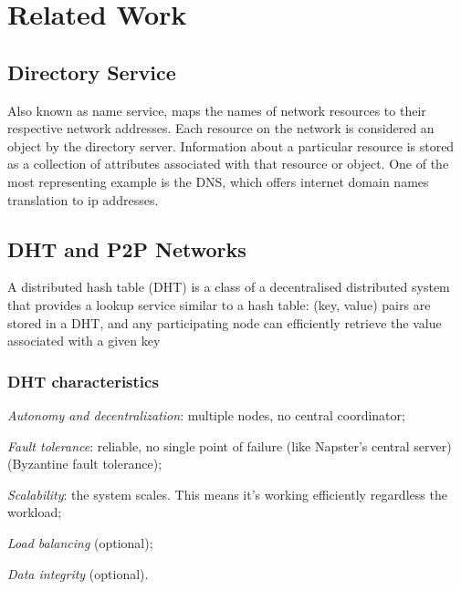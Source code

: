 \chapter{Related Work}
\label{chapter:related_work}

\section{Directory Service}
Also known as name service, maps the names of network resources to their respective network addresses. Each resource on the network is considered an object by the directory server. Information about a particular resource is stored as a collection of attributes associated with that resource or object. One of the most representing example is the DNS, which offers internet domain names translation to ip addresses.

\section{DHT and P2P Networks}
A distributed hash table (DHT) is a class of a decentralised distributed system that provides a lookup service similar to a hash table: (key, value) pairs are stored in a DHT, and any participating node can efficiently retrieve the value associated with a given key

\subsection{DHT characteristics}
\begin{list}{}{}
\item \emph{Autonomy and decentralization}: multiple nodes, no central coordinator;
\item \emph{Fault tolerance}: reliable, no single point of failure (like Napster’s central server) (Byzantine fault tolerance);
\item \emph{Scalability}: the system scales. This means it’s working efficiently regardless the workload; 
\item \emph{Load balancing} (optional);
\item \emph{Data integrity} (optional).
\end{list}  

